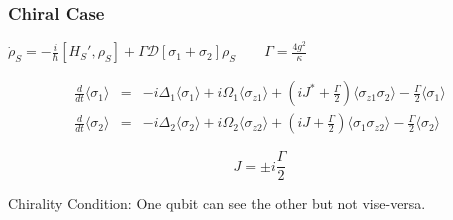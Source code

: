 \documentclass{beamer}
\begin{document}
\begin{frame}
\frametitle{Chiral Case}

$\dot{\rho}_S = - \frac{i}{\hbar}[H_S',\rho_S] + \Gamma \mathcal{D}[\sigma_1 + \sigma_2]\rho_S \qquad \Gamma = \frac{4g^2}{\kappa}$

\begin{eqnarray}
\frac{d}{d t} \langle \sigma_1 \rangle & = &  - i \Delta_1 \langle \sigma_1 \rangle + i \Omega_1 \langle \sigma_{z1} \rangle + \left( iJ^* + \frac{\Gamma}{2} \right) \langle \sigma_{z1} \sigma_2 \rangle - \frac{\Gamma}{2} \langle \sigma_1 \rangle  \nonumber \\
\frac{d}{dt } \langle \sigma_2 \rangle &=& - i \Delta_2 \langle \sigma_2 \rangle + i \Omega_2 \langle \sigma_{z2} \rangle + \left( i J + \frac{\Gamma}{2} \right) \langle \sigma_1 \sigma_{z2} \rangle  - \frac{\Gamma}{2} \langle \sigma_2 \rangle \nonumber 
\end{eqnarray}

\begin{equation}
\boxed{ J = \pm i \frac{\Gamma}{2} } \nonumber
\end{equation} 

Chirality Condition: One qubit can see the other but not vise-versa.
\end{frame}
\end{document}

